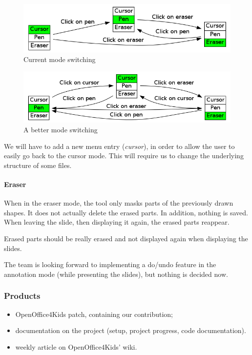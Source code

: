 \documentclass[a4paper,11pt]{article}
\begin{document}
\begin{figure}[!h]
\centering
\includegraphics[scale=0.5]{images/modes_current.png}
\caption{Current mode switching}
\end{figure}

\begin{figure}[!h]
\centering
\includegraphics[scale=0.5]{images/modes.png}
\caption{A better mode switching}
\end{figure}

We will have to add a new menu entry (\emph{cursor}), in order to allow the
user to easily go back to the cursor mode. This will require us to change the
underlying structure of some files.

\paragraph*{Eraser}

When in the eraser mode, the tool only masks parts of the previously drawn
shapes. It does not actually delete the erased parts. In addition, nothing is
saved. When leaving the slide, then displaying it again, the erased parts
reappear.

Erased parts should be really erased and not displayed again when displaying
the slides.

The team is looking forward to implementing a do/undo feature in the
annotation mode (while presenting the slides), but nothing is decided now.

\subsubsection*{Products}

\begin{itemize}
\item OpenOffice4Kids patch, containing our contribution;
\item documentation on the project (setup, project progress, code documentation).
\item weekly article on OpenOffice4Kids' wiki.
\end{itemize}
\end{document}
